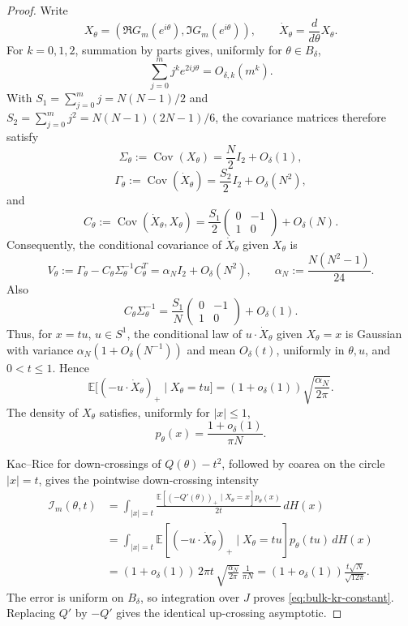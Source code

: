 \documentclass[11pt]{amsart}
\numberwithin{equation}{section}
\theoremstyle{definition}
\theoremstyle{remark}
\newcommand{\Exp}{\mathbb E}
\newcommand{\Cov}{\operatorname{Cov}}
\begin{document}
\begin{proof}
Write
\[
  X_\theta=(\Re G_m(e^{i\theta}),\Im G_m(e^{i\theta})),\qquad
  \dot X_\theta=\frac{d}{d\theta}X_\theta .
\]
For \(k=0,1,2\), summation by parts gives, uniformly for
\(\theta\in B_\delta\),
\[
  \sum_{j=0}^{m}j^k e^{2ij\theta}=O_{\delta,k}(m^k).
\]
With \(S_1=\sum_{j=0}^m j=N(N-1)/2\) and
\(S_2=\sum_{j=0}^m j^2=N(N-1)(2N-1)/6\), the covariance matrices therefore
satisfy
\[
  \Sigma_\theta:=\Cov(X_\theta)=\frac N2 I_2+O_\delta(1),
\]
\[
  \Gamma_\theta:=\Cov(\dot X_\theta)=\frac{S_2}{2}I_2+O_\delta(N^2),
\]
and
\[
  C_\theta:=\Cov(\dot X_\theta,X_\theta)
  =
  \frac{S_1}{2}
  \begin{pmatrix}0&-1\\ 1&0\end{pmatrix}
  +O_\delta(N).
\]
Consequently, the conditional covariance of \(\dot X_\theta\) given
\(X_\theta\) is
\[
  V_\theta
  :=\Gamma_\theta-C_\theta\Sigma_\theta^{-1}C_\theta^{T}
  =
  \alpha_N I_2+O_\delta(N^2),
  \qquad
  \alpha_N:=\frac{N(N^2-1)}{24}.
\]
Also
\[
  C_\theta\Sigma_\theta^{-1}
  =
  \frac{S_1}{N}
  \begin{pmatrix}0&-1\\ 1&0\end{pmatrix}
  +O_\delta(1).
\]
Thus, for \(x=tu\), \(u\in S^1\), the conditional law of
\(u\cdot\dot X_\theta\) given \(X_\theta=x\) is Gaussian with variance
\(\alpha_N(1+O_\delta(N^{-1}))\) and mean \(O_\delta(t)\), uniformly in
\(\theta,u\), and \(0<t\le1\).  Hence
\[
  \Exp\bigl[(-u\cdot\dot X_\theta)_+\mid X_\theta=tu\bigr]
  =
  (1+o_\delta(1))\sqrt{\frac{\alpha_N}{2\pi}}.
\]
The density of \(X_\theta\) satisfies, uniformly for \(|x|\le1\),
\[
  p_\theta(x)=\frac{1+o_\delta(1)}{\pi N}.
\]

Kac--Rice for down-crossings of \(Q(\theta)-t^2\), followed by coarea on the
circle \(|x|=t\), gives the pointwise down-crossing intensity
\[
\begin{aligned}
  \mathcal I_m(\theta,t)
  &=
  \int_{|x|=t}
  \frac{\Exp[(-Q'(\theta))_+\mid X_\theta=x]p_\theta(x)}{2t}\,dH(x)  \\
  &=
  \int_{|x|=t}
  \Exp[(-u\cdot\dot X_\theta)_+\mid X_\theta=tu]p_\theta(tu)\,dH(x) \\
  &=
  (1+o_\delta(1))\,2\pi t\,
     \sqrt{\frac{\alpha_N}{2\pi}}\,
     \frac1{\pi N}
   =
  (1+o_\delta(1))\frac{t\sqrt N}{\sqrt{12\pi}}.
\end{aligned}
\]
The error is uniform on \(B_\delta\), so integration over \(J\) proves
\eqref{eq:bulk-kr-constant}.  Replacing \(Q'\) by \(-Q'\) gives the identical
up-crossing asymptotic.
\end{proof}
\end{document}
